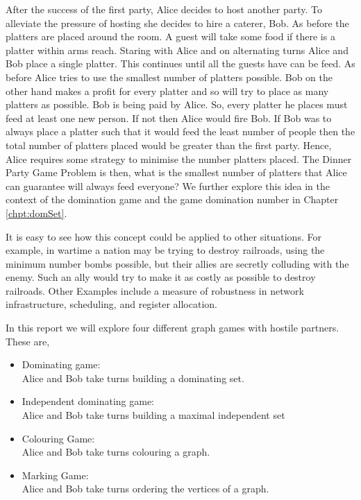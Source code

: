 After the success of the first party, Alice decides to host another party. To alleviate the pressure of hosting she decides to hire a caterer, Bob. As before the platters are placed around the room. A guest will take some food if there is a platter within arms reach. Staring with Alice and on alternating turns Alice and Bob place a single platter. This continues until all the guests have can be feed. As before Alice tries to use the smallest number of platters possible. Bob on the other hand makes a profit for every platter and so will try to place as many platters as possible. Bob is being paid by Alice. So, every platter he places must feed at least one new person. If not then Alice would fire Bob. If Bob was to always place a platter such that it would feed the least number of people then the total number of platters placed would be greater than the first party. Hence, Alice requires some strategy to minimise the number platters placed. The Dinner Party Game Problem is then, what is the smallest number of platters that Alice can guarantee will always feed everyone? 
We further explore this idea in the context of the domination game and the game domination number in Chapter \ref{chpt:domSet}.

It is easy to see how this concept could be applied to other situations. For example, in wartime a nation may be trying to destroy railroads, using the minimum number bombs possible, but their allies are secretly colluding with the enemy. Such an ally would try to make it as costly as possible to destroy railroads. Other Examples include a measure of robustness in network infrastructure, scheduling, and register allocation.  

In this report %
we will explore four different graph games with hostile partners. These are,
\begin{itemize}
    \item Dominating game: \\
        Alice and Bob take turns building a dominating set.
    \item Independent dominating game: \\
        Alice and Bob take turns building a maximal independent set    
    \item Colouring Game: \\
        Alice and Bob take turns colouring a graph.
    \item Marking Game: \\
        Alice and Bob take turns ordering the vertices of a graph.
\end{itemize}

